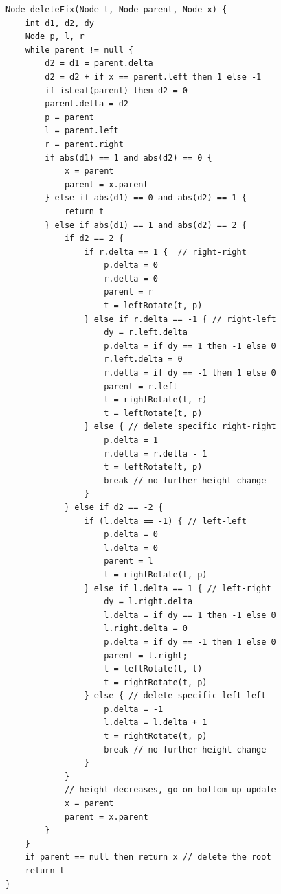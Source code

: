 \documentclass[b5paper]{article}
\begin{document}
\begin{lstlisting}[language = Bourbaki]
Node deleteFix(Node t, Node parent, Node x) {
    int d1, d2, dy
    Node p, l, r
    while parent != null {
        d2 = d1 = parent.delta
        d2 = d2 + if x == parent.left then 1 else -1
        if isLeaf(parent) then d2 = 0
        parent.delta = d2
        p = parent
        l = parent.left
        r = parent.right
        if abs(d1) == 1 and abs(d2) == 0 {
            x = parent
            parent = x.parent
        } else if abs(d1) == 0 and abs(d2) == 1 {
            return t
        } else if abs(d1) == 1 and abs(d2) == 2 {
            if d2 == 2 {
                if r.delta == 1 {  // right-right
                    p.delta = 0
                    r.delta = 0
                    parent = r
                    t = leftRotate(t, p)
                } else if r.delta == -1 { // right-left
                    dy = r.left.delta
                    p.delta = if dy == 1 then -1 else 0
                    r.left.delta = 0
                    r.delta = if dy == -1 then 1 else 0
                    parent = r.left
                    t = rightRotate(t, r)
                    t = leftRotate(t, p)
                } else { // delete specific right-right
                    p.delta = 1
                    r.delta = r.delta - 1
                    t = leftRotate(t, p)
                    break // no further height change
                }
            } else if d2 == -2 {
                if (l.delta == -1) { // left-left
                    p.delta = 0
                    l.delta = 0
                    parent = l
                    t = rightRotate(t, p)
                } else if l.delta == 1 { // left-right
                    dy = l.right.delta
                    l.delta = if dy == 1 then -1 else 0
                    l.right.delta = 0
                    p.delta = if dy == -1 then 1 else 0
                    parent = l.right;
                    t = leftRotate(t, l)
                    t = rightRotate(t, p)
                } else { // delete specific left-left
                    p.delta = -1
                    l.delta = l.delta + 1
                    t = rightRotate(t, p)
                    break // no further height change
                }
            }
            // height decreases, go on bottom-up update
            x = parent
            parent = x.parent
        }
    }
    if parent == null then return x // delete the root
    return t
}
\end{lstlisting}

\ifx\wholebook\relax \else




\expandafter\enddocument
\fi
\end{document}
